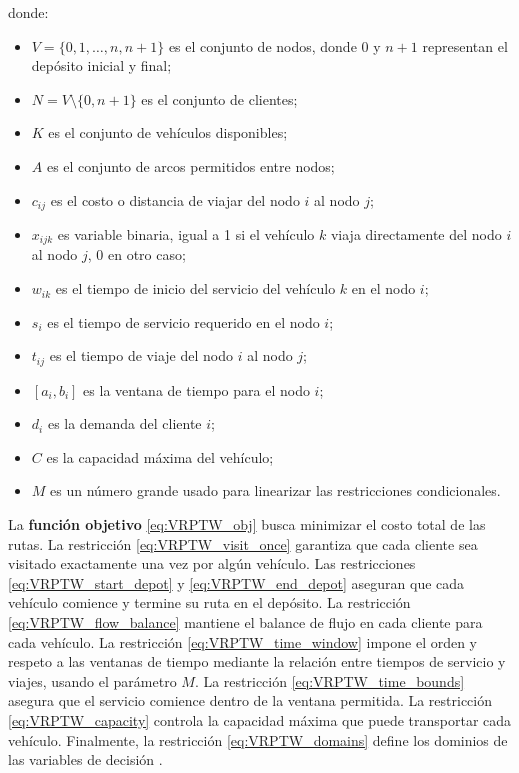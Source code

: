 \documentclass[12pt,titlepage,twoside,openright]{book}
\begin{document}
\medskip
\noindent donde:
\begin{itemize}
    \item \(V = \{0, 1, \ldots, n, n+1\}\) es el conjunto de nodos, donde \(0\) y \(n+1\) representan el depósito inicial y final;
    \item \(N = V \setminus \{0, n+1\}\) es el conjunto de clientes;
    \item \(K\) es el conjunto de vehículos disponibles;
    \item \(A\) es el conjunto de arcos permitidos entre nodos;
    \item \(c_{ij}\) es el costo o distancia de viajar del nodo \(i\) al nodo \(j\);
    \item \(x_{ijk}\) es variable binaria, igual a 1 si el vehículo \(k\) viaja directamente del nodo \(i\) al nodo \(j\), 0 en otro caso;
    \item \(w_{ik}\) es el tiempo de inicio del servicio del vehículo \(k\) en el nodo \(i\);
    \item \(s_i\) es el tiempo de servicio requerido en el nodo \(i\);
    \item \(t_{ij}\) es el tiempo de viaje del nodo \(i\) al nodo \(j\);
    \item \([a_i, b_i]\) es la ventana de tiempo para el nodo \(i\);
    \item \(d_i\) es la demanda del cliente \(i\);
    \item \(C\) es la capacidad máxima del vehículo;
    \item \(M\) es un número grande usado para linearizar las restricciones condicionales.
\end{itemize}

La \textbf{función objetivo} \eqref{eq:VRPTW_obj} busca minimizar el costo total de las rutas. La restricción \eqref{eq:VRPTW_visit_once} garantiza que cada cliente sea visitado exactamente una vez por algún vehículo. Las restricciones \eqref{eq:VRPTW_start_depot} y \eqref{eq:VRPTW_end_depot} aseguran que cada vehículo comience y termine su ruta en el depósito. La restricción \eqref{eq:VRPTW_flow_balance} mantiene el balance de flujo en cada cliente para cada vehículo. La restricción \eqref{eq:VRPTW_time_window} impone el orden y respeto a las ventanas de tiempo mediante la relación entre tiempos de servicio y viajes, usando el parámetro \(M\). La restricción \eqref{eq:VRPTW_time_bounds} asegura que el servicio comience dentro de la ventana permitida. La restricción \eqref{eq:VRPTW_capacity} controla la capacidad máxima que puede transportar cada vehículo. Finalmente, la restricción \eqref{eq:VRPTW_domains} define los dominios de las variables de decisión \citep{toth2014}.
\end{document}
